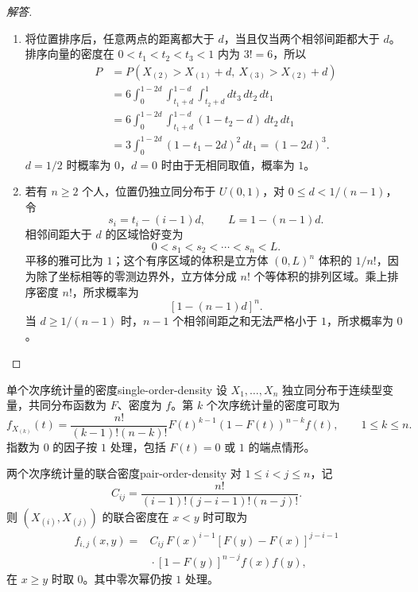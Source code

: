 \begin{proof}[解答]
\begin{enumerate}
\item 将位置排序后，任意两点的距离都大于 $d$，当且仅当两个相邻间距都大于 $d$。排序向量的密度在 $0<t_1<t_2<t_3<1$ 内为 $3!=6$，所以
\begin{align*}
P&=P(X_{(2)}>X_{(1)}+d,\ X_{(3)}>X_{(2)}+d)\\
&=6\int_0^{1-2d}\int_{t_1+d}^{1-d}\int_{t_2+d}^1
 dt_3\,dt_2\,dt_1\\
&=6\int_0^{1-2d}\int_{t_1+d}^{1-d}(1-t_2-d)\,dt_2\,dt_1\\
&=3\int_0^{1-2d}(1-t_1-2d)^2\,dt_1
=(1-2d)^3.
\end{align*}
$d=1/2$ 时概率为 $0$，$d=0$ 时由于无相同取值，概率为 $1$。

\item 若有 $n\geq2$ 个人，位置仍独立同分布于 $U(0,1)$，对 $0\leq d<1/(n-1)$，令
\[
s_i=t_i-(i-1)d,\qquad L=1-(n-1)d.
\]
相邻间距大于 $d$ 的区域恰好变为
\[
0<s_1<s_2<\cdots<s_n<L.
\]
平移的雅可比为 $1$；这个有序区域的体积是立方体 $(0,L)^n$ 体积的 $1/n!$，因为除了坐标相等的零测边界外，立方体分成 $n!$ 个等体积的排列区域。乘上排序密度 $n!$，所求概率为
\[
[1-(n-1)d]^n.
\]
当 $d\geq1/(n-1)$ 时，$n-1$ 个相邻间距之和无法严格小于 $1$，所求概率为 $0$。
\end{enumerate}
\end{proof}

\begin{mytheorem}{单个次序统计量的密度}{single-order-density}
设 $X_1,\ldots,X_n$ 独立同分布于连续型变量，共同分布函数为 $F$、密度为 $f$。第 $k$ 个次序统计量的密度可取为
\[
f_{X_{(k)}}(t)=
\frac{n!}{(k-1)!(n-k)!}
F(t)^{k-1}(1-F(t))^{n-k}f(t),
\qquad 1\leq k\leq n.
\]
指数为 $0$ 的因子按 $1$ 处理，包括 $F(t)=0$ 或 $1$ 的端点情形。
\end{mytheorem}

\begin{mytheorem}{两个次序统计量的联合密度}{pair-order-density}
对 $1\leq i<j\leq n$，记
\[
C_{ij}=\frac{n!}{(i-1)!(j-i-1)!(n-j)!}.
\]
则 $(X_{(i)},X_{(j)})$ 的联合密度在 $x<y$ 时可取为
\[
\begin{aligned}
f_{i,j}(x,y)
={}&C_{ij}\,F(x)^{i-1}[F(y)-F(x)]^{j-i-1}\\
&{}\cdot[1-F(y)]^{n-j}f(x)f(y),
\end{aligned}
\]
在 $x\geq y$ 时取 $0$。其中零次幂仍按 $1$ 处理。
\end{mytheorem}

